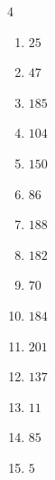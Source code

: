 \begin{multicols}{4}
\begin{enumerate}
\columnbreak %

  \item $25$


  \item $47$


  \item $185$


  \item $104$


  \item $150$


  \item $86$


  \item $188$


  \item $182$


  \item $70$


  \item $184$


  \item $201$


  \item $137$


  \item $11$


  \item $85$


  \item $5$


\columnbreak %


\end{enumerate}
\end{multicols}
